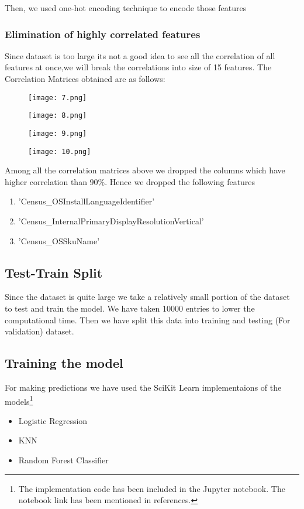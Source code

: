 \documentclass[conference]{IEEEtran}
\begin{document}
Then, we used one-hot encoding technique to encode those features

\subsubsection{Elimination of highly correlated features}
Since dataset is too large its not a good idea to see all the correlation of all features at once,we will break the correlations into size of 15 features. The Correlation Matrices obtained are as follows:
\begin{figure}[H]
    \centering
    \texttt{[image: 7.png]}
\end{figure}
\begin{figure}[H]
    \centering
    \texttt{[image: 8.png]}
\end{figure}
\begin{figure}[H]
    \centering
    \texttt{[image: 9.png]}
\end{figure}
\begin{figure}[H]
    \centering
    \texttt{[image: 10.png]}
\end{figure}

Among all the correlation matrices above we dropped the columns which have higher correlation than $90 \%$. Hence we dropped the following features
\begin{enumerate}
    \item 'Census\_OSInstallLanguageIdentifier'
    \item 'Census\_InternalPrimaryDisplayResolutionVertical'
    \item 'Census\_OSSkuName'
\end{enumerate}

\subsection{Test-Train Split}
Since the dataset is quite large we take a relatively small portion of the dataset to test and train the model. We have taken 10000 entries to lower the computational time. Then we have split this data into training and testing (For validation) dataset.

\subsection{Training the model}
For making predictions we have used the SciKit Learn implementaions of the models\footnote{The implementation code has been included in the Jupyter notebook. The notebook link has been mentioned in references.}
\begin{itemize}
    \item Logistic Regression
    \item KNN
    \item Random Forest Classifier
\end{itemize}
\end{document}
